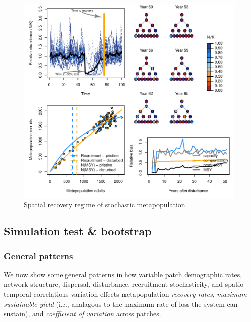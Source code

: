 \documentclass[]{article}
\begin{document}
\begin{figure}[H]

{\centering \includegraphics{Managing_for_ecological_surprises_in_metapopulations_makeHTML_files/figure-latex/example results4-1} 

}

\caption{Spatial recovery regime of stochastic metapopulation.}\label{fig:example results4}
\end{figure}

\hypertarget{simulation-test-bootstrap}{%
\subsection{Simulation test \&
bootstrap}\label{simulation-test-bootstrap}}

\hypertarget{general-patterns}{%
\subsubsection{General patterns}\label{general-patterns}}

We now show some general patterns in how variable patch demographic
rates, network structure, dispersal, disturbance, recruitment
stochasticity, and spatio-temporal correlations variation effects
metapopulation \emph{recovery rates}, \emph{maximum sustainable yield}
(i.e., analagous to the maximum rate of loss the system can sustain),
and \emph{coefficient of variation} across patches.
\end{document}
